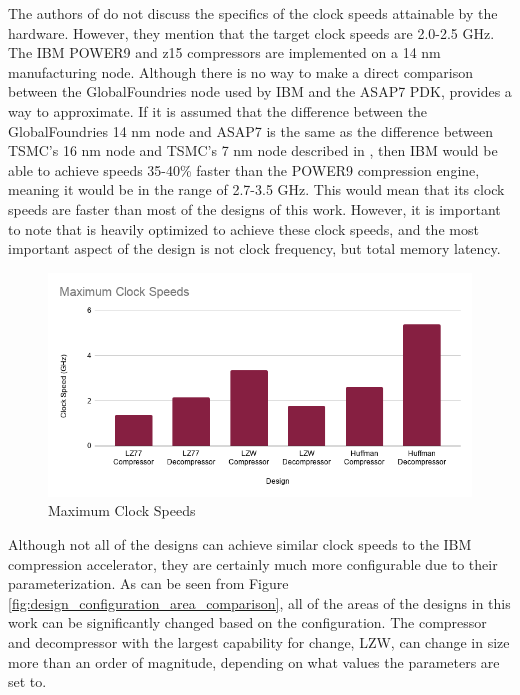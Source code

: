 \documentclass[doublespace,nopageskip]{VTthesis}
\begin{document}
The authors of \cite{ibm} do not discuss the specifics of the clock speeds attainable by the hardware. However, they mention that the target clock speeds are 2.0-2.5 GHz. The IBM POWER9 and z15 compressors are implemented on a 14 nm manufacturing node. Although there is no way to make a direct comparison between the GlobalFoundries node used by IBM and the ASAP7 PDK, \cite{wikichip-manufacturing-conversion} provides a way to approximate. If it is assumed that the difference between the GlobalFoundries 14 nm node and ASAP7 is the same as the difference between TSMC's 16 nm node and TSMC's 7 nm node described in \cite{wikichip-manufacturing-conversion}, then IBM would be able to achieve speeds 35-40\% faster than the POWER9 compression engine, meaning it would be in the range of 2.7-3.5 GHz. This would mean that its clock speeds are faster than most of the designs of this work. However, it is important to note that \cite{ibm} is heavily optimized to achieve these clock speeds, and the most important aspect of the design is not clock frequency, but total memory latency.

\begin{figure}[htb]
	\centering
	\includegraphics[scale=0.6]{Maximum Clock Speeds.png}
	\caption{Maximum Clock Speeds}
	\label{fig:maximum_clock_speeds}
\end{figure}

Although not all of the designs can achieve similar clock speeds to the IBM compression accelerator, they are certainly much more configurable due to their parameterization. As can be seen from Figure \ref{fig:design_configuration_area_comparison}, all of the areas of the designs in this work can be significantly changed based on the configuration. The compressor and decompressor with the largest capability for change, LZW, can change in size more than an order of magnitude, depending on what values the parameters are set to.
\end{document}
